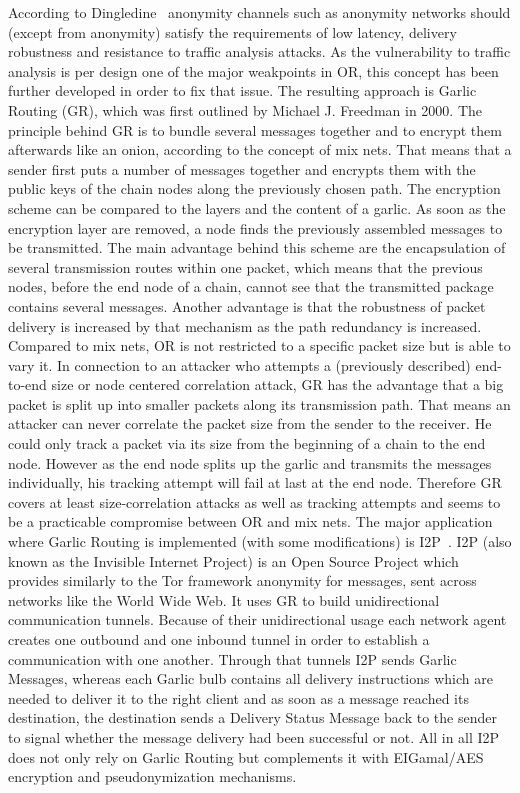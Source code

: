 \documentclass{sig-alternate}
\begin{document}
According to Dingledine~\cite{dingledine2000free} anonymity channels such as anonymity networks should (except from anonymity) satisfy the requirements of low latency, delivery robustness and resistance to traffic analysis attacks. As the vulnerability to traffic analysis is per design one of the major weakpoints in OR, this concept has been further developed in order to fix that issue. The resulting approach is Garlic Routing (GR), which was first outlined by Michael J. Freedman in 2000. The principle behind GR is to bundle several messages together and to encrypt them afterwards like an onion, according to the concept of mix nets. That means that a sender first puts a number of messages together and encrypts them with the public keys of the chain nodes along the previously chosen path. The encryption scheme can be compared to the layers and the content of a garlic. As soon as the encryption layer are removed, a node finds the previously assembled messages to be transmitted. The main advantage behind this scheme are the encapsulation of several transmission routes within one packet, which means that the previous nodes, before the end node of a chain, cannot see that the transmitted package contains several messages. Another advantage is that the robustness of packet delivery is increased by that mechanism as the path redundancy is increased. Compared to mix nets, OR is not restricted to a specific packet size but is able to vary it. In connection to an attacker who attempts a (previously described) end-to-end size or node centered correlation attack, GR has the advantage that a big packet is split up into smaller packets along its transmission path. That means an attacker can never correlate the packet size from the sender to the receiver. He could only track a packet via its size from the beginning of a chain to the end node. However as the end node splits up the garlic and transmits the messages individually, his tracking attempt will fail at last at the end node. Therefore GR covers at least size-correlation attacks as well as tracking attempts and seems to be a practicable compromise between OR and mix nets. The major application where Garlic Routing is implemented (with some modifications) is I2P~\cite{i2p}. I2P (also known as the Invisible Internet Project) is an Open Source Project which provides similarly to the Tor framework anonymity for messages, sent across networks like the World Wide Web. It uses GR to build unidirectional communication tunnels. Because of their unidirectional usage each network agent creates one outbound and one inbound tunnel in order to establish a communication with one another. Through that tunnels I2P sends Garlic Messages, whereas each Garlic bulb contains all delivery instructions which are needed to deliver it to the right client and as soon as a message reached its destination, the destination sends a Delivery Status Message back to the sender to signal whether the message delivery had been successful or not. All in all I2P does not only rely on Garlic Routing but complements it with EIGamal/AES encryption and pseudonymization mechanisms. 
\end{document}
